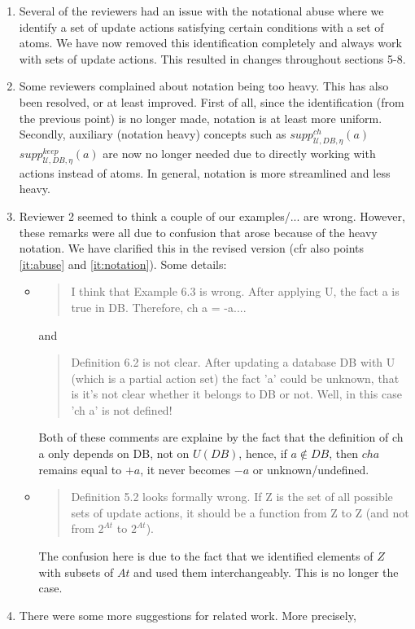 \documentclass{article}
\begin{document}
\begin{enumerate}
	  \item \label{it:abuse}Several of the reviewers had an issue with the notational abuse where we identify a set of update actions satisfying certain conditions with a set of atoms. We have now removed this identification completely and always work with sets of update actions.  This resulted in changes throughout sections 5-8.
	  \item \label{it:notation} Some reviewers complained about notation being too heavy. This has also been resolved, or at least improved. First of all, since the identification (from the previous point) is no longer made, notation is at least more uniform. Secondly, auxiliary (notation heavy) concepts such as $\mathit{supp}_{\mathcal{U},\mathit{DB},\eta}^{ch}(a)$ $\mathit{supp}_{\mathcal{U},\mathit{DB},\eta}^{keep}(a)$ are now no longer needed due to directly working with actions instead of atoms. In general, notation is more streamlined and less heavy. 
	  \item Reviewer 2 seemed to think a couple of our examples/... are wrong. However, these remarks were all due to confusion that arose because of the heavy notation. 
	  We have clarified this in the revised version (cfr also points \ref{it:abuse} and \ref{it:notation}). Some details: 
	  \begin{itemize}
	  \item \begin{quote}I think that Example 6.3 is wrong. After applying U, the fact a is true in DB.
Therefore, ch a = -a.... \end{quote} and 
\begin{quote}
 Definition 6.2 is not clear. After updating a database DB with U (which is a partial action set) the
fact 'a' could be unknown, that is it's not clear whether it belongs to DB or not.
Well, in this case 'ch a' is not defined!
\end{quote}
Both of these comments are explaine by the fact that the definition of ch a only depends on DB, not on $U(DB)$, hence, if $a\not\in DB$, then  $ch a$ remains equal to $+a$, it never becomes $-a$ or unknown/undefined. 
	  \item \begin{quote}
	         Definition 5.2 looks formally wrong. If Z is the set of all possible sets of update actions, it should be a function from Z to Z (and not from $2^{At}$ to $2^{At}$).
	        \end{quote}
	         The confusion here is due to the fact that we identified elements of $Z$  with subsets of $At$ and used them interchangeably. This is no longer the case.
	      
\end{itemize}
\item There were some more suggestions for related work. More precisely, 

	  \end{enumerate}
\end{document}
